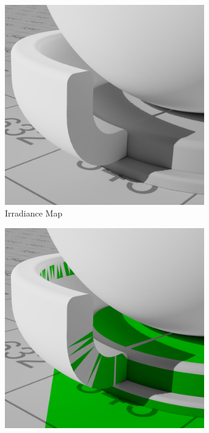 	\begin{figure}[H]
		\begin{subfigure}[b]{0.5\textwidth}
			\center
			\includegraphics[width=0.95\textwidth]{pic/irrmap-shaderball2-irrmap.png}
			\caption{Irradiance Map}
		\end{subfigure}
		\begin{subfigure}[b]{0.5\textwidth}
			\center
			\includegraphics[width=0.95\textwidth]{pic/irrmap-shaderball2-irrmap-order.png}

\end{subfigure}
\end{figure}
